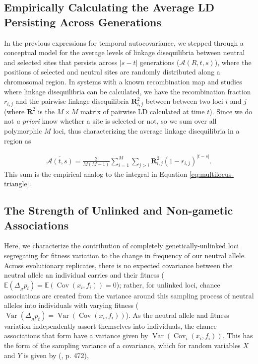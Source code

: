 \documentclass[11pt]{article}
\newcommand{\E}{\mathbb{E}}
\DeclareMathOperator{\var}{Var}
\DeclareMathOperator{\cov}{Cov}
\begin{document}
\subsection{Empirically Calculating the Average LD Persisting Across Generations}

In the previous expressions for temporal autocovariance, we stepped through a
conceptual model for the average levels of linkage disequilibria between
neutral and selected sites that persists across $|s-t|$ generations
($\mathcal{A}(R, t,s)$), where the positions of selected and neutral sites are
randomly distributed along a chromosomal region. In systems with a known
recombination map and studies where linkage disequilibria can be calculated, we
have the recombination fraction $r_{i,j}$ and the pairwise linkage
disequilibria $\mathbf{R}^2_{i,j}$ between between two loci $i$ and $j$ (where
$\mathbf{R}^2$ is the $M \times M$ matrix of pairwise LD calculated at time
$t$). Since we do not \emph{a priori} know whether a site is selected or not,
so we sum over all polymorphic $M$ loci, thus characterizing the average
linkage disequilibria in a region as

\begin{align}
  \label{eq:supp-emp-assoc}
  \overline{\mathcal{A}(t, s)} = \frac{2}{M(M-1)} \sum_{i=1}^{M} \sum_{j > i} \mathbf{R}_{i,j}^2  (1-r_{i,j})^{|t-s|}.
\end{align}
%
This sum is the empirical analog to the integral in Equation
\eqref{eq:multilocus-triangle}.

\subsection{The Strength of Unlinked and Non-gametic Associations}
\label{ap:strength-assoc}

Here, we characterize the contribution of completely genetically-unlinked loci
segregating for fitness variation to the change in frequency of our neutral
allele. Across evolutionary replicates, there is no expected covariance between
the neutral allele an individual carries and their fitness ($\E(\Delta_{_H}
p_t)= \E(\cov(x_i, f_i)) = 0$); rather, for unlinked loci, chance associations
are created from the variance around this sampling process of neutral alleles
into individuals with varying fitness ($\var(\Delta_{_H} p_t)= \var(\cov(x_i,
f_i))$). As the neutral allele and fitness variation independently assort
themselves into individuals, the chance associations that form have a variance
given by $\var(\cov_i(x_i, f_i))$.  This has the form of the sampling variance
of a covariance, which for random variables $X$ and $Y$ is given by
\citeauthor{Kendall1994-gp} (\citeyear{Kendall1994-gp}, p. 472),
\end{document}
